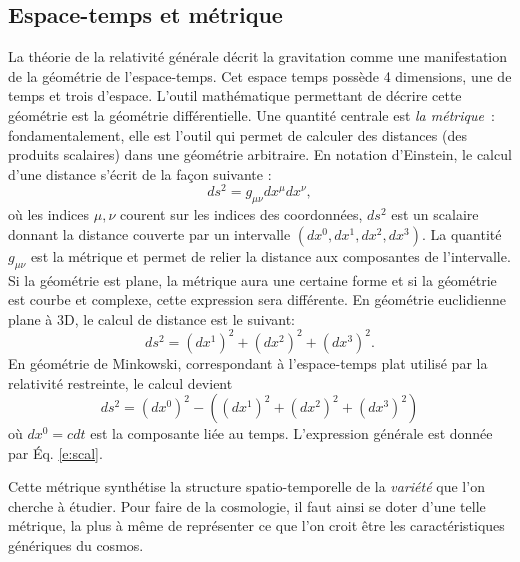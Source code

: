 \subsection{Espace-temps et métrique}
La théorie de la relativité générale décrit la gravitation comme une manifestation de la géométrie de l'espace-temps. Cet espace temps possède 4 dimensions, une de temps et trois d'espace. L'outil mathématique permettant de décrire cette géométrie est la géométrie différentielle. Une quantité centrale est \textit{la métrique}~: fondamentalement, elle est l'outil qui permet de calculer des distances (des produits scalaires) dans une géométrie arbitraire. En notation d'Einstein, le calcul d'une distance s'écrit de la façon suivante :
\begin{equation}
ds^2=g_{\mu\nu}dx^\mu dx^\nu,
\label{e:scal}
\end{equation}
où les indices $\mu,\nu$ courent sur les indices des coordonnées, $ds^2$ est un scalaire donnant la distance couverte par un intervalle $(dx^0,dx^1,dx^2,dx^3)$. La quantité $g_{\mu\nu}$ est la métrique et permet de relier la distance aux composantes de l'intervalle. Si la géométrie est plane, la métrique aura une certaine forme et si la géométrie est courbe et complexe, cette expression sera différente. En géométrie euclidienne plane à 3D, le calcul de distance est le suivant:
\begin{equation}
ds^2=(dx^1)^2+(dx^2)^2+(dx^3)^2.
\end{equation} 
En géométrie de Minkowski, correspondant à l'espace-temps plat utilisé par la relativité restreinte, le calcul devient
\begin{equation}
ds^2=(dx^0)^2 -((dx^1)^2+(dx^2)^2+(dx^3)^2)
\end{equation} 
où $dx^0=cdt$ est la composante liée au temps. L'expression générale est donnée par Éq. \ref{e:scal}.

Cette métrique synthétise la structure spatio-temporelle de la \textit{variété} que l'on cherche à étudier. Pour faire de la cosmologie, il faut ainsi se doter d'une telle métrique, la plus à même de représenter ce que l'on croit être les caractéristiques génériques du cosmos.

